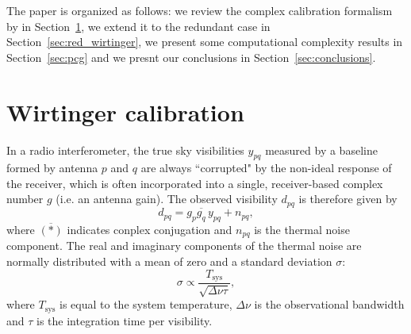 \documentclass[useAMS,usenatbib]{mn2e}
\newcommand{\conj}[1]{\overline{#1}}
\begin{document}
The paper is organized as follows: we review the complex calibration formalism by \citet{Smirnov2015} in Section~\ref{sec:sky_wirtinger}, we extend it to the redundant case in Section~\ref{sec:red_wirtinger}, we present some computational complexity results in Section~\ref{sec:pcg} and we presnt our conclusions in Section~\ref{sec:conclusions}.

\section{Wirtinger calibration}
\label{sec:sky_wirtinger}

In a radio interferometer, the true sky visibilities $y_{pq}$ measured by a baseline formed by antenna $p$ and $q$ are always ``corrupted" by the non-ideal response of the receiver, which is often incorporated into a single, receiver-based complex number $g$ (i.e. an antenna gain). The observed visibility $d_{pq}$ is therefore given by \citep{ME1,ME2,RRIME1}
\begin{equation}
\label{eq:vis_definition}
d_{pq} = g_{p}\conj{g_q} \, y_{pq} + n_{pq},
\end{equation}
where $\conj{(*)}$ indicates conplex conjugation and $n_{pq}$ is the thermal noise component. 
The real and imaginary components of the thermal noise are normally distributed with a mean of zero and a
standard deviation $\sigma$:
\begin{equation}
\sigma \propto \frac{T_{\textrm{sys}}}{\sqrt{\Delta \nu \tau}},
\end{equation}
where $T_{\textrm{sys}}$ is equal to the system temperature, $\Delta \nu$ is the observational bandwidth and $\tau$ is the integration time per visibility.
\end{document}
